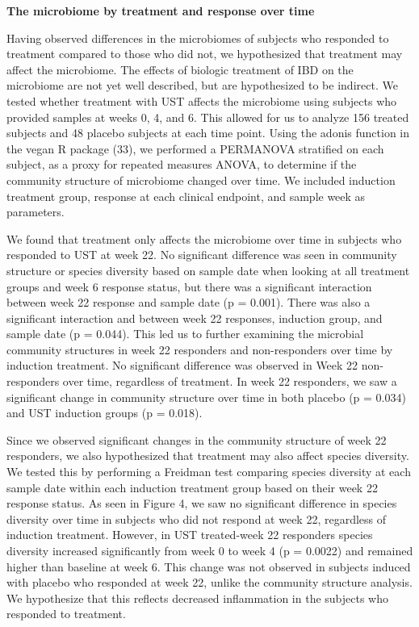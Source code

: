 \documentclass[11pt,]{article}
\begin{document}
\textbf{The microbiome by treatment and response over time}

Having observed differences in the microbiomes of subjects who responded
to treatment compared to those who did not, we hypothesized that
treatment may affect the microbiome. The effects of biologic treatment
of IBD on the microbiome are not yet well described, but are
hypothesized to be indirect. We tested whether treatment with UST
affects the microbiome using subjects who provided samples at weeks 0,
4, and 6. This allowed for us to analyze 156 treated subjects and 48
placebo subjects at each time point. Using the adonis function in the
vegan R package (33), we performed a PERMANOVA stratified on each
subject, as a proxy for repeated measures ANOVA, to determine if the
community structure of microbiome changed over time. We included
induction treatment group, response at each clinical endpoint, and
sample week as parameters.

We found that treatment only affects the microbiome over time in
subjects who responded to UST at week 22. No significant difference was
seen in community structure or species diversity based on sample date
when looking at all treatment groups and week 6 response status, but
there was a significant interaction between week 22 response and sample
date (p = 0.001). There was also a significant interaction and between
week 22 responses, induction group, and sample date (p = 0.044). This
led us to further examining the microbial community structures in week
22 responders and non-responders over time by induction treatment. No
significant difference was observed in Week 22 non-responders over time,
regardless of treatment. In week 22 responders, we saw a significant
change in community structure over time in both placebo (p = 0.034) and
UST induction groups (p = 0.018).

Since we observed significant changes in the community structure of week
22 responders, we also hypothesized that treatment may also affect
species diversity. We tested this by performing a Freidman test
comparing species diversity at each sample date within each induction
treatment group based on their week 22 response status. As seen in
Figure 4, we saw no significant difference in species diversity over
time in subjects who did not respond at week 22, regardless of induction
treatment. However, in UST treated-week 22 responders species diversity
increased significantly from week 0 to week 4 (p = 0.0022) and remained
higher than baseline at week 6. This change was not observed in subjects
induced with placebo who responded at week 22, unlike the community
structure analysis. We hypothesize that this reflects decreased
inflammation in the subjects who responded to treatment.
\end{document}
